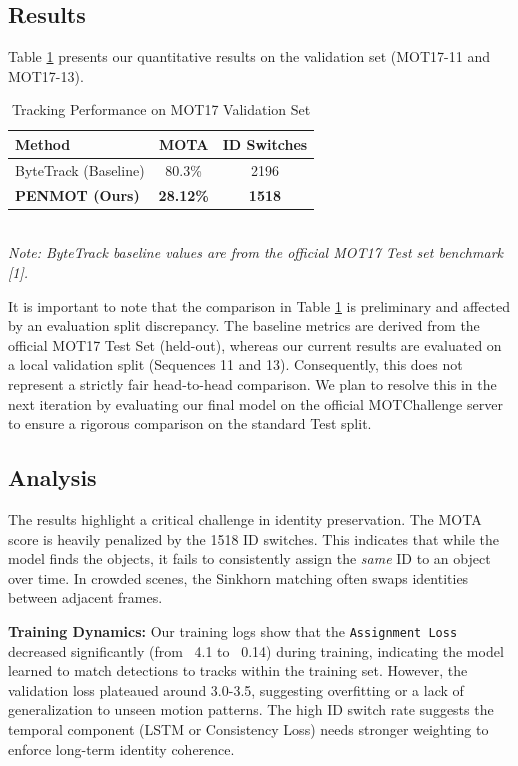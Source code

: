 \documentclass{article}
\begin{document}
\subsection{Results}

Table \ref{tab:results} presents our quantitative results on the validation set (MOT17-11 and MOT17-13).

\begin{table}[h]
  \caption{Tracking Performance on MOT17 Validation Set}
  \label{tab:results}
  \centering
  \begin{tabular}{lcc}
    \toprule
    Method & MOTA & ID Switches \\
    \midrule
    ByteTrack (Baseline) & 80.3\% & 2196 \\
    \textbf{PENMOT (Ours)} & \textbf{28.12\%} & \textbf{1518} \\
    \bottomrule
  \end{tabular}
  \vspace{0.2cm} \\
  \textit{Note: ByteTrack baseline values are from the official MOT17 Test set benchmark [1].}
\end{table}

It is important to note that the comparison in Table \ref{tab:results} is preliminary and affected by an evaluation split discrepancy. The baseline metrics are derived from the official MOT17 Test Set (held-out), whereas our current results are evaluated on a local validation split (Sequences 11 and 13). Consequently, this does not represent a strictly fair head-to-head comparison. We plan to resolve this in the next iteration by evaluating our final model on the official MOTChallenge server to ensure a rigorous comparison on the standard Test split.

\subsection{Analysis}

The results highlight a critical challenge in identity preservation. The MOTA score is heavily penalized by the 1518 ID switches. This indicates that while the model finds the objects, it fails to consistently assign the \textit{same} ID to an object over time. In crowded scenes, the Sinkhorn matching often swaps identities between adjacent frames.

\textbf{Training Dynamics:}
Our training logs show that the \texttt{Assignment Loss} decreased significantly (from ~4.1 to ~0.14) during training, indicating the model learned to match detections to tracks within the training set. However, the validation loss plateaued around 3.0-3.5, suggesting overfitting or a lack of generalization to unseen motion patterns. The high ID switch rate suggests the temporal component (LSTM or Consistency Loss) needs stronger weighting to enforce long-term identity coherence.
\end{document}

